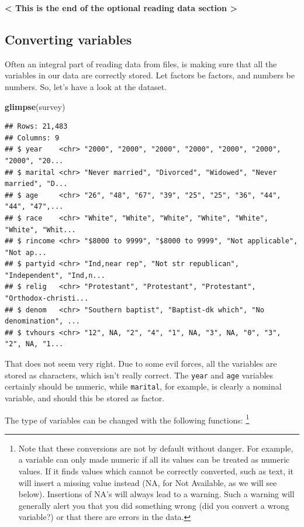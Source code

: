 \documentclass[]{tufte-book}
\newenvironment{Shaded}{}{}
\newcommand{\KeywordTok}[1]{\textcolor[rgb]{0.00,0.44,0.13}{\textbf{#1}}}
\newcommand{\NormalTok}[1]{#1}
\begin{document}
\textbf{\textless{} This is the end of the optional reading data section \textgreater{}}

\hypertarget{converting-variables}{%
\subsection{Converting variables}\label{converting-variables}}

Often an integral part of reading data from files, is making sure that all the variables in our data are correctly stored. Let factors be factors, and numbers be numbers. So, let's have a look at the dataset.

\begin{Shaded}
\begin{Highlighting}[]
\KeywordTok{glimpse}\NormalTok{(survey)}
\end{Highlighting}
\end{Shaded}

\begin{verbatim}
## Rows: 21,483
## Columns: 9
## $ year    <chr> "2000", "2000", "2000", "2000", "2000", "2000", "2000", "20...
## $ marital <chr> "Never married", "Divorced", "Widowed", "Never married", "D...
## $ age     <chr> "26", "48", "67", "39", "25", "25", "36", "44", "44", "47",...
## $ race    <chr> "White", "White", "White", "White", "White", "White", "Whit...
## $ rincome <chr> "$8000 to 9999", "$8000 to 9999", "Not applicable", "Not ap...
## $ partyid <chr> "Ind,near rep", "Not str republican", "Independent", "Ind,n...
## $ relig   <chr> "Protestant", "Protestant", "Protestant", "Orthodox-christi...
## $ denom   <chr> "Southern baptist", "Baptist-dk which", "No denomination", ...
## $ tvhours <chr> "12", NA, "2", "4", "1", NA, "3", NA, "0", "3", "2", NA, "1...
\end{verbatim}

That does not seem very right. Due to some evil forces, all the variables are stored as characters, which isn't really correct. The \texttt{year} and \texttt{age} variables certainly should be numeric, while \texttt{marital}, for example, is clearly a nominal variable, and should this be stored as factor.

The type of variables can be changed with the following functions: \footnote{Note that these conversions are not by default without danger. For example, a variable can only made numeric if all its values can be treated as numeric values. If it finds values which cannot be correctly converted, such as text, it will insert a missing value instead (NA, for Not Available, as we will see below). Insertions of NA's will always lead to a warning. Such a warning will generally alert you that you did something wrong (did you convert a wrong variable?) or that there are errors in the data.}
\end{document}
